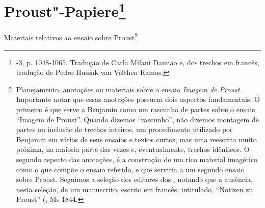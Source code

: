 \chapter{Proust"-Papiere\footnote[*]{-3, p. 1048-1065. Tradução de Carla Milani Damião e, dos trechos em francês, tradução de
  Pedro Hussak van Velthen Ramos.}}

Materiais relativos ao ensaio sobre Proust\footnote{Planejamento,
  anotações ou materiais sobre o ensaio \emph{Imagem de Proust.}
  Importante notar que essas anotações possuem dois aspectos
  fundamentais. O primeiro é que serve a Benjamin como um rascunho de
  partes sobre o ensaio ``Imagem de Proust''. Quando dizemos
  ``rascunho'', não dizemos montagem de partes ou inclusão de trechos
  inteiros, um procedimento utilizado por Benjamin em vários de seus
  ensaios e textos curtos, mas uma reescrita muito próxima, na maioria
  parte das vezes e, eventualmente, trechos idênticos. O segundo aspecto
  das anotações, é a construção de um rico material imagético como o que
  compõe o ensaio referido, e que serviria a um segundo ensaio sobre
  Proust. Seguimos a seleção dos editores dos , notando que a
  ausência, nesta seleção, de um manuscrito, escrito em francês,
  intitulado, ``Notizen zu Proust'' (, Ms 1844.}

